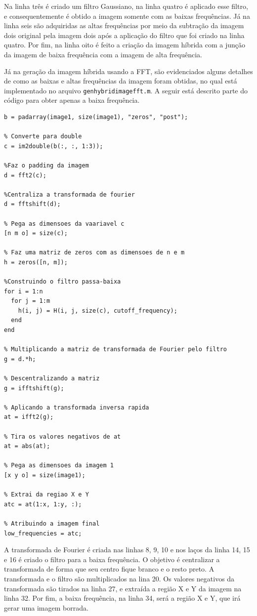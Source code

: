 Na linha três é criado um filtro Gaussiano, na linha quatro é aplicado esse filtro, e consequentemente é obtido a imagem somente com as baixas frequências. Já na linha seis são adquiridas as altas frequências por meio da subtração da imagem dois original pela imagem dois após a aplicação do filtro que foi criado na linha quatro. Por fim, na linha oito é feito a criação da imagem híbrida com a junção da imagem de baixa frequência com a imagem de alta frequência. 



Já na geração da imagem híbrida usando a FFT, são evidenciados 
alguns detalhes de como as baixas e altas frequências da imagem foram obtidas, no qual está implementado no arquivo \texttt{gen\textunderscore hybrid\textunderscore image\textunderscore fft.m}. A seguir está descrito parte do código para obter apenas a baixa frequência.

\begin{lstlisting}[style=Matlab-editor]
% Cria um padding
b = padarray(image1, size(image1), "zeros", "post");

% Converte para double
c = im2double(b(:, :, 1:3));

%Faz o padding da imagem
d = fft2(c);

%Centraliza a transformada de fourier
d = fftshift(d);

% Pega as dimensoes da vaariavel c
[n m o] = size(c);

% Faz uma matriz de zeros com as dimensoes de n e m
h = zeros([n, m]);

%Construindo o filtro passa-baixa
for i = 1:n
  for j = 1:m
    h(i, j) = H(i, j, size(c), cutoff_frequency);
  end
end

% Multiplicando a matriz de transformada de Fourier pelo filtro
g = d.*h;

% Descentralizando a matriz
g = ifftshift(g);

% Aplicando a transformada inversa rapida
at = ifft2(g);

% Tira os valores negativos de at
at = abs(at);

% Pega as dimensoes da imagem 1
[x y o] = size(image1);

% Extrai da regiao X e Y
atc = at(1:x, 1:y, :);

% Atribuindo a imagem final
low_frequencies = atc;

\end{lstlisting}

A transformada de Fourier é criada nas linhas 8, 9, 10 e nos laços da linha 14, 15 e 16 é criado o filtro para a baixa frequência. O objetivo é centralizar a transformada de forma que seu centro fique branco e o resto preto. A transformada e o filtro são multiplicados na lina 20. Os valores negativos da transformada são tirados na linha 27, e extraída a região X e Y da imagem na linha 32. Por fim, a baixa frequência, na linha 34, será a região X e Y, que irá gerar uma imagem borrada.


